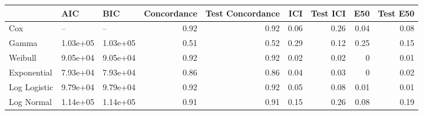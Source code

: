 \begin{table*}
\centering
\label{tab:afr_models}
\begin{tabular}{lllrrrrrr}
\toprule
 & AIC & BIC & Concordance & Test Concordance & ICI & Test ICI & E50 & Test E50 \\
\midrule
Cox & -- & -- & 0.92 & 0.92 & 0.06 & 0.26 & 0.04 & 0.08 \\
Gamma & 1.03e+05 & 1.03e+05 & 0.51 & 0.52 & 0.29 & 0.12 & 0.25 & 0.15 \\
Weibull & 9.05e+04 & 9.05e+04 & 0.92 & 0.92 & 0.02 & 0.02 & 0 & 0.01 \\
Exponential & 7.93e+04 & 7.93e+04 & 0.86 & 0.86 & 0.04 & 0.03 & 0 & 0.02 \\
Log Logistic & 9.79e+04 & 9.79e+04 & 0.92 & 0.92 & 0.05 & 0.08 & 0.01 & 0.01 \\
Log Normal & 1.14e+05 & 1.14e+05 & 0.91 & 0.91 & 0.15 & 0.26 & 0.08 & 0.19 \\
\bottomrule
\end{tabular}
\end{table*}
